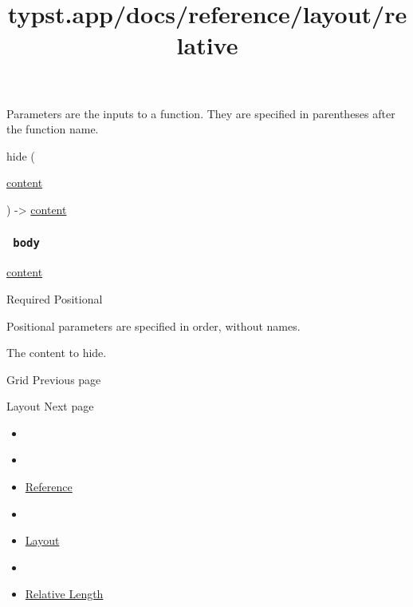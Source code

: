 \label{parameters-tooltip}
Parameters are the inputs to a function. They are specified in
parentheses after the function name.

{ hide } (

{ \href{/docs/reference/foundations/content/}{content} }

) -\textgreater{} \href{/docs/reference/foundations/content/}{content}

\subsubsection{\texorpdfstring{\texttt{\ body\ }}{ body }}\label{parameters-body}

\href{/docs/reference/foundations/content/}{content}

{Required} {{ Positional }}

\label{parameters-body-positional-tooltip}
Positional parameters are specified in order, without names.

The content to hide.

\href{/docs/reference/layout/grid/}{\pandocbounded{}}

{ Grid } { Previous page }

\href{/docs/reference/layout/layout/}{\pandocbounded{}}

{ Layout } { Next page }


\title{typst.app/docs/reference/layout/relative}

\begin{itemize}
\tightlist
\item
  \href{/docs}{}
\item
  
\item
  \href{/docs/reference/}{Reference}
\item
  
\item
  \href{/docs/reference/layout/}{Layout}
\item
  
\item
  \href{/docs/reference/layout/relative/}{Relative Length}
\end{itemize}

